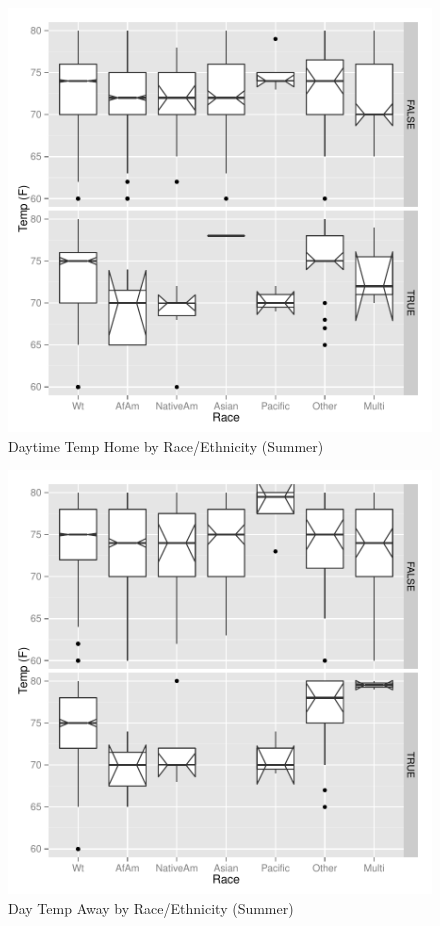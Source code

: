 \documentclass{article}
\begin{document}
\begin{figure}
\begin{center}
\caption{Daytime Temp Home by Race/Ethnicity (Summer)}
\label{fig:HomeRaceS}
\includegraphics{DraftEdwardsWoods-015}
\end{center}
\end{figure}


\begin{figure}
\begin{center}
\caption{Day Temp Away by Race/Ethnicity (Summer)}
\label{fig:AwayRaceS}
\includegraphics{DraftEdwardsWoods-016}
\end{center}
\end{figure}
\end{document}
